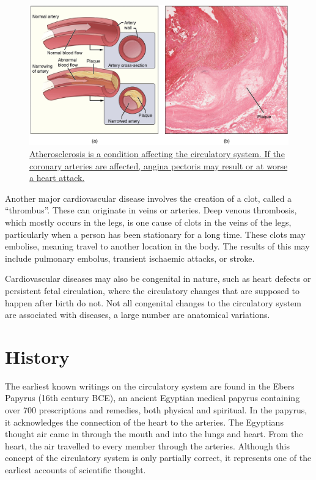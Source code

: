 \begin{figure}

{\centering \includegraphics[width=0.7\linewidth]{./figures/circulation/2113ab_Atherosclerosis} 

}

\caption{\href{https://commons.wikimedia.org/wiki/File:2113ab_Atherosclerosis.jpg}{Atherosclerosis is a condition affecting the circulatory system. If the coronary arteries are affected, angina pectoris may result or at worse a heart attack.}}\label{fig:atherosclerosis}
\end{figure}

Another major cardiovascular disease involves the creation of a clot, called a ``thrombus''. These can originate in veins or arteries. Deep venous thrombosis, which mostly occurs in the legs, is one cause of clots in the veins of the legs, particularly when a person has been stationary for a long time. These clots may embolise, meaning travel to another location in the body. The results of this may include pulmonary embolus, transient ischaemic attacks, or stroke.

Cardiovascular diseases may also be congenital in nature, such as heart defects or persistent fetal circulation, where the circulatory changes that are supposed to happen after birth do not. Not all congenital changes to the circulatory system are associated with diseases, a large number are anatomical variations.

\hypertarget{history}{%
\section{History}\label{history}}

The earliest known writings on the circulatory system are found in the Ebers Papyrus (16th century BCE), an ancient Egyptian medical papyrus containing over 700 prescriptions and remedies, both physical and spiritual. In the papyrus, it acknowledges the connection of the heart to the arteries. The Egyptians thought air came in through the mouth and into the lungs and heart. From the heart, the air travelled to every member through the arteries. Although this concept of the circulatory system is only partially correct, it represents one of the earliest accounts of scientific thought.

